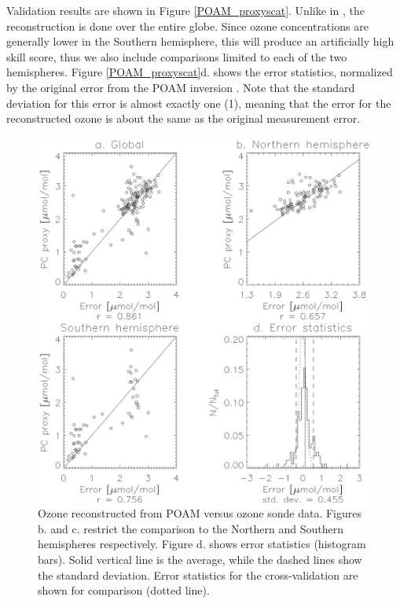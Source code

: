 Validation results are shown in Figure \ref{POAM_proxyscat}.
Unlike in \citet{Randall_etal2002}, the reconstruction is done over
the entire globe.
Since ozone concentrations are generally lower in the Southern
hemisphere, this will produce an artificially high skill score,
thus we also include comparisons limited to each of the
two hemispheres.
Figure \ref{POAM_proxyscat}d. shows the error statistics, 
normalized by the original error from the POAM inversion \citep{Lumpe_etal2002}.
Note that the standard deviation for this error is almost exactly
one (1), meaning that the error for the reconstructed ozone is
about the same as the original measurement error.

\begin{figure}
\begin{center}
\includegraphics[width=1\textwidth]{proxyvssonde.eps}
\caption{Ozone reconstructed from POAM versus ozone sonde data.
Figures b. and c. restrict the comparison to the Northern and Southern
hemispheres respectively.
Figure d. shows error statistics (histogram bars).
Solid vertical line is the average, while the dashed lines show
the standard deviation.  Error statistics for the cross-validation
are shown for comparison (dotted line).}
\label{proxyvssonde}
\end{center}
\end{figure}

